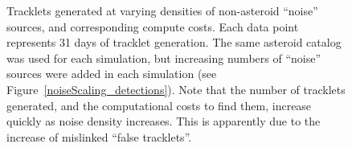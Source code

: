 \begin{figure}[ht!]
\caption{Tracklets generated at varying densities of non-asteroid
  ``noise'' sources, and corresponding compute costs.  Each data point
  represents 31 days of tracklet generation.  The same asteroid
  catalog was used for each simulation, but increasing numbers of
  ``noise'' sources were added in each simulation (see
  Figure~\ref{noiseScaling_detections}). Note that the number of
  tracklets generated, and the computational costs to find them,
  increase quickly as noise density increases. This is apparently due
  to the increase of mislinked ``false tracklets''. }
\label{noiseScaling_tracklets}
\end{figure}


\begin{figure}[ht!]
\centering

\\

\end{figure}
